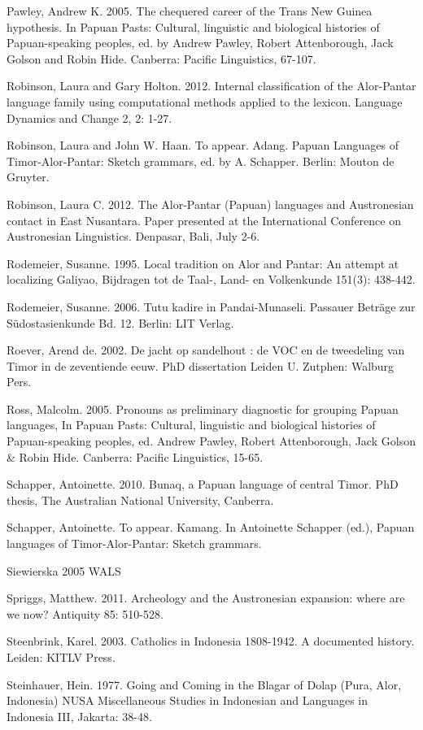 Pawley, Andrew K. 2005. The chequered career of the Trans New Guinea hypothesis. In Papuan Pasts: Cultural, linguistic and biological histories of Papuan-speaking peoples, ed. by Andrew Pawley, Robert Attenborough, Jack Golson and Robin Hide. Canberra: Pacific Linguistics, 67-107.

Robinson, Laura and Gary Holton. 2012. Internal classification of the Alor-Pantar language family using computational methods applied to the lexicon. Language Dynamics and Change 2, 2: 1-27.

Robinson, Laura and John W. Haan. To appear. Adang. Papuan Languages of Timor-Alor-Pantar: Sketch grammars, ed. by A. Schapper. Berlin: Mouton de Gruyter.

Robinson, Laura C. 2012. The Alor-Pantar (Papuan) languages and Austronesian contact in East Nusantara. Paper presented at the International Conference on Austronesian Linguistics. Denpasar, Bali, July 2-6.

Rodemeier, Susanne. 1995. Local tradition on Alor and Pantar: An attempt at localizing Galiyao, Bijdragen tot de Taal-, Land- en Volkenkunde 151(3): 438-442.

Rodemeier, Susanne. 2006. Tutu kadire in Pandai-Munaseli. Passauer Betr\"age zur S\"udostasienkunde Bd. 12. Berlin: LIT Verlag.

Roever, Arend de. 2002. De jacht op sandelhout : de VOC en de tweedeling van Timor in de zeventiende eeuw. PhD dissertation Leiden U. Zutphen: Walburg Pers. 

Ross, Malcolm. 2005. Pronouns as preliminary diagnostic for grouping Papuan languages, In Papuan Pasts: Cultural, linguistic and biological histories of Papuan-speaking peoples, ed. Andrew Pawley, Robert Attenborough, Jack Golson \& Robin Hide. Canberra: Pacific Linguistics, 15-65.

Schapper, Antoinette. 2010. Bunaq, a Papuan language of central Timor. PhD thesis, The Australian National University, Canberra.

Schapper, Antoinette. To appear. Kamang. In Antoinette Schapper (ed.), Papuan languages of Timor-Alor-Pantar: Sketch grammars. 

Siewierska 2005 WALS

Spriggs, Matthew. 2011. Archeology and the Austronesian expansion: where are we now? Antiquity 85: 510-528.

Steenbrink, Karel. 2003. Catholics in Indonesia 1808-1942. A documented history. Leiden: KITLV Press.

Steinhauer, Hein. 1977. Going and Coming in the Blagar of Dolap (Pura, Alor, Indonesia) NUSA Miscellaneous Studies in Indonesian and Languages in Indonesia III, Jakarta: 38-48.

